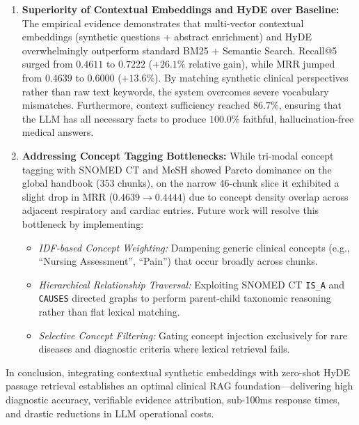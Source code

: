 \documentclass[11pt,a4paper]{article}
\begin{document}
\begin{enumerate}[leftmargin=1.8em, itemsep=0.3em]
    \item \textbf{Superiority of Contextual Embeddings and HyDE over Baseline:}
    The empirical evidence demonstrates that multi-vector contextual embeddings (synthetic questions + abstract enrichment) and HyDE overwhelmingly outperform standard BM25 + Semantic Search. Recall@5 surged from $0.4611$ to $0.7222$ ($+26.1\%$ relative gain), while MRR jumped from $0.4639$ to $0.6000$ ($+13.6\%$). By matching synthetic clinical perspectives rather than raw text keywords, the system overcomes severe vocabulary mismatches. Furthermore, context sufficiency reached $86.7\%$, ensuring that the LLM has all necessary facts to produce $100.0\%$ faithful, hallucination-free medical answers.

    \item \textbf{Addressing Concept Tagging Bottlenecks:}
    While tri-modal concept tagging with SNOMED CT and MeSH showed Pareto dominance on the global handbook ($353$ chunks), on the narrow 46-chunk slice it exhibited a slight drop in MRR ($0.4639 \to 0.4444$) due to concept density overlap across adjacent respiratory and cardiac entries. Future work will resolve this bottleneck by implementing:
    \begin{itemize}[leftmargin=1.5em, itemsep=0.1em]
        \item \textit{IDF-based Concept Weighting:} Dampening generic clinical concepts (e.g., ``Nursing Assessment'', ``Pain'') that occur broadly across chunks.
        \item \textit{Hierarchical Relationship Traversal:} Exploiting SNOMED CT \texttt{IS\_A} and \texttt{CAUSES} directed graphs to perform parent-child taxonomic reasoning rather than flat lexical matching.
        \item \textit{Selective Concept Filtering:} Gating concept injection exclusively for rare diseases and diagnostic criteria where lexical retrieval fails.
    \end{itemize}
\end{enumerate}

In conclusion, integrating contextual synthetic embeddings with zero-shot HyDE passage retrieval establishes an optimal clinical RAG foundation---delivering high diagnostic accuracy, verifiable evidence attribution, sub-100ms response times, and drastic reductions in LLM operational costs.
\end{document}
